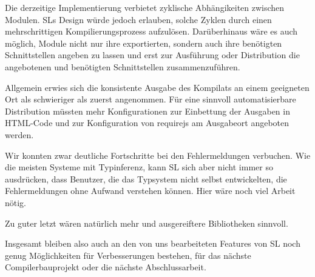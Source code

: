 \documentclass[runningheads]{llncs}
\begin{document}
Die derzeitige Implementierung verbietet zyklische Abhängikeiten zwischen
Modulen. SLs Design würde jedoch erlauben, solche Zyklen durch einen
mehrschrittigen Kompilierungsprozess aufzulösen. Darüberhinaus wäre es auch
möglich, Module nicht nur ihre exportierten, sondern auch ihre benötigten
Schnittstellen angeben zu lassen und erst zur Ausführung oder Distribution
die angebotenen und benötigten Schnittstellen zusammenzuführen.

Allgemein erwies sich die konsistente Ausgabe des Kompilats an einem
geeigneten Ort als schwieriger als zuerst angenommen. Für eine sinnvoll
automatisierbare Distribution müssten mehr Konfigurationen zur Einbettung
der Ausgaben in HTML-Code und zur Konfiguration von requirejs am Ausgabeort
angeboten werden.

Wir konnten zwar deutliche Fortschritte bei den Fehlermeldungen verbuchen.
Wie die meisten Systeme mit Typinferenz, kann SL sich aber nicht immer so
ausdrücken, dass Benutzer, die das Typsystem nicht selbst entwickelten,
die Fehlermeldungen ohne Aufwand verstehen können. Hier wäre noch viel Arbeit
nötig.

Zu guter letzt wären natürlich mehr und ausgereiftere Bibliotheken
sinnvoll.

Insgesamt bleiben also auch an den von uns bearbeiteten Features von SL
noch genug Möglichkeiten für Verbesserungen bestehen, für das nächste
Compilerbauprojekt oder die nächste Abschlussarbeit.
\end{document}
